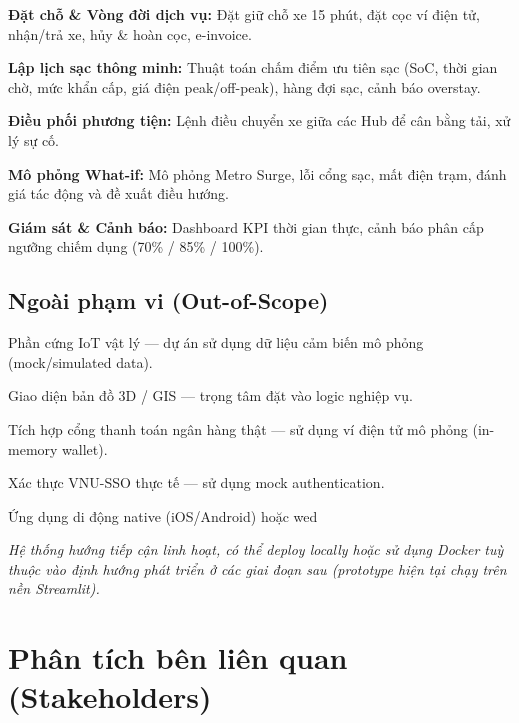 \documentclass[12pt,a4paper]{report}
\begin{document}
\textbf{Đặt chỗ \& Vòng đời dịch vụ:} Đặt giữ chỗ xe 15 phút, đặt cọc ví điện tử, nhận/trả xe, hủy \& hoàn cọc, e-invoice.

\textbf{Lập lịch sạc thông minh:} Thuật toán chấm điểm ưu tiên sạc (SoC, thời gian chờ, mức khẩn cấp, giá điện peak/off-peak), hàng đợi sạc, cảnh báo overstay.

\textbf{Điều phối phương tiện:} Lệnh điều chuyển xe giữa các Hub để cân bằng tải, xử lý sự cố.

\textbf{Mô phỏng What-if:} Mô phỏng Metro Surge, lỗi cổng sạc, mất điện trạm, đánh giá tác động và đề xuất điều hướng.

\textbf{Giám sát \& Cảnh báo:} Dashboard KPI thời gian thực, cảnh báo phân cấp ngưỡng chiếm dụng (70\% / 85\% / 100\%).

\subsection{Ngoài phạm vi (Out-of-Scope)}

Phần cứng IoT vật lý --- dự án sử dụng dữ liệu cảm biến mô phỏng (mock/simulated data).

Giao diện bản đồ 3D / GIS --- trọng tâm đặt vào logic nghiệp vụ.

Tích hợp cổng thanh toán ngân hàng thật --- sử dụng ví điện tử mô phỏng (in-memory wallet).

Xác thực VNU-SSO thực tế --- sử dụng mock authentication.

Ứng dụng di động native (iOS/Android) hoặc wed 

\textit{Hệ thống hướng tiếp cận linh hoạt, có thể deploy locally hoặc sử dụng Docker tuỳ thuộc vào định hướng phát triển ở các giai đoạn sau (prototype hiện tại chạy trên nền Streamlit).}

\section{Phân tích bên liên quan (Stakeholders)}
\end{document}
